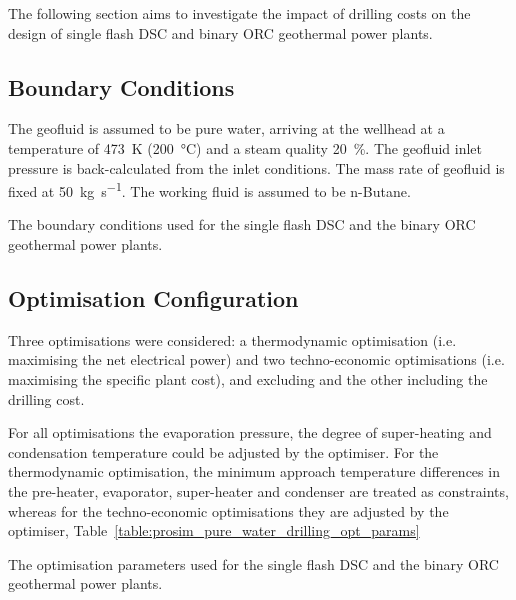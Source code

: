 The following section aims to investigate the impact of drilling costs on the design of single flash \ac{DSC} and binary \ac{ORC} geothermal power plants.

\subsection{Boundary Conditions}
    The geofluid is assumed to be pure water, arriving at the wellhead at a temperature of \qty{473}{\K} (\qty{200}{\degreeCelsius}) and a steam quality \qty{20}{\percent}. The geofluid inlet pressure is back-calculated from the inlet conditions. The mass rate of geofluid is fixed at \qty{50}{\kg\per\s}. The working fluid is assumed to be n-Butane.

    \begin{table}[H]
        \centering
        \caption{The boundary conditions used for the single flash \ac{DSC} and the binary \ac{ORC} geothermal power plants.}
        \label{table:prosim_pure_water_drilling_boundary}
                
    \end{table}

\subsection{Optimisation Configuration}
    Three optimisations were considered: a thermodynamic optimisation (i.e. maximising the net electrical power) and two techno-economic optimisations (i.e. maximising the specific plant cost), and excluding and the other including the drilling cost.
    
    For all optimisations the evaporation pressure, the degree of super-heating and condensation temperature could be adjusted by the optimiser. For the thermodynamic optimisation, the minimum approach temperature differences in the pre-heater, evaporator, super-heater and condenser are treated as constraints, whereas for the techno-economic optimisations they are adjusted by the optimiser, Table~\ref{table:prosim_pure_water_drilling_opt_params}

    \begin{table}[H]
        \centering
        \caption{The optimisation parameters used for the single flash \ac{DSC} and the binary \ac{ORC} geothermal power plants.}
        \label{table:prosim_pure_water_drilling_opt_params}
        \resizebox{\linewidth}{!}{}        
    \end{table}

